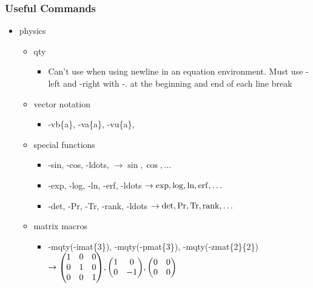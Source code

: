 \documentclass[fleqn, 11pt]{beamer}
\begin{document}
\begin{frame}
	\frametitle{Useful Commands}
	
	\begin{itemize}
		\item<1-> physics
		\begin{itemize}
			\item<2-> qty
			\begin{itemize}
				\item<3-> Can't use when using newline in an equation environment. Must use -left and -right with -. at the beginning and end of each line break
			\end{itemize}
			\item<2-> vector notation
			\begin{itemize}
				\item<4-> -vb\{a\}, -va\{a\}, -vu\{a\},
			\end{itemize}
			\item<2-> special functions
			\begin{itemize}
				\item<5-> -sin, -cos, -ldots, $\rightarrow \sin, \cos, \ldots$
				\item<5-> -exp, -log, -ln, -erf, -ldots $\rightarrow \exp, \log, \ln, \erf, \ldots$
				\item<5-> -det, -Pr, -Tr, -rank, -ldots $\rightarrow \det, \Pr, \Tr, \rank, \ldots$
			\end{itemize}
		\item<2-> matrix macros
		\begin{itemize}
			\item<6-> -mqty(-imat\{3\}), -mqty(-pmat\{3\}), -mqty(-zmat\{2\}\{2\}) $\rightarrow \mqty(\imat{3}), \mqty(\pmat{3}), \mqty(\zmat{2}{2})$
		\end{itemize}
		\end{itemize}
	\end{itemize}

\end{frame}
\end{document}
